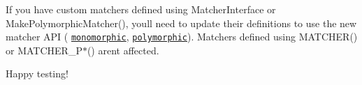 If you have custom matchers defined using {\ttfamily Matcher\+Interface} or {\ttfamily Make\+Polymorphic\+Matcher()}, you\textquotesingle{}ll need to update their definitions to use the new matcher A\+PI ( \href{./docs/CookBook.md#writing-new-monomorphic-matchers}{\tt monomorphic}, \href{./docs/CookBook.md#writing-new-polymorphic-matchers}{\tt polymorphic}). Matchers defined using {\ttfamily M\+A\+T\+C\+H\+E\+R()} or {\ttfamily M\+A\+T\+C\+H\+E\+R\+\_\+\+P$\ast$()} aren\textquotesingle{}t affected.

Happy testing! 
